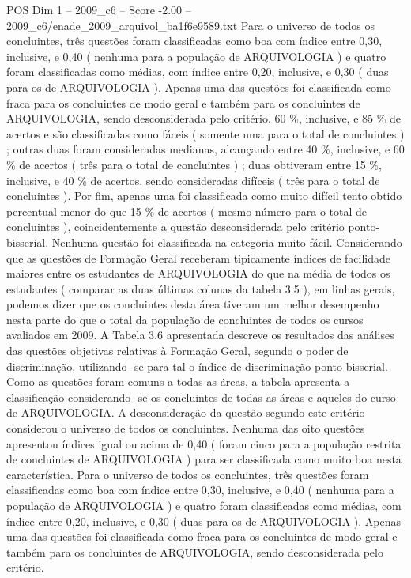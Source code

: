 \begin{textsample}{POS Dim 1 – 2009\_c6 – Score -2.00 – 2009\_c6/enade\_2009\_arquivol\_ba1f6e9589.txt}
Para o universo de todos os concluintes, três questões foram classificadas como boa com índice entre 0,30, inclusive, e 0,40 ( nenhuma para a população de ARQUIVOLOGIA ) e quatro foram classificadas como médias, com índice entre 0,20, inclusive, e 0,30 ( duas para os de ARQUIVOLOGIA ).
Apenas uma das questões foi classificada como fraca para os concluintes de modo geral e também para os concluintes de ARQUIVOLOGIA, sendo desconsiderada pelo critério. 60 \%, inclusive, e 85 \% de acertos e são classificadas como fáceis ( somente uma para o total de concluintes ) ; outras duas foram consideradas medianas, alcançando entre 40 \%, inclusive, e 60 \% de acertos ( três para o total de concluintes ) ; duas obtiveram entre 15 \%, inclusive, e 40 \% de acertos, sendo consideradas difíceis ( três para o total de concluintes ).
Por fim, apenas uma foi classificada como muito difícil tento obtido percentual menor do que 15 \% de acertos ( mesmo número para o total de concluintes ), coincidentemente a questão desconsiderada pelo critério ponto-bisserial.
Nenhuma questão foi classificada na categoria muito fácil.
Considerando que as questões de Formação Geral receberam tipicamente índices de facilidade maiores entre os estudantes de ARQUIVOLOGIA do que na média de todos os estudantes ( comparar as duas últimas colunas da tabela 3.5 ), em linhas gerais, podemos dizer que os concluintes desta área tiveram um melhor desempenho nesta parte do que o total da população de concluintes de todos os cursos avaliados em 2009.
A Tabela 3.6 apresentada descreve os resultados das análises das questões objetivas relativas à Formação Geral, segundo o poder de discriminação, utilizando -se para tal o índice de discriminação ponto-bisserial.
Como as questões foram comuns a todas as áreas, a tabela apresenta a classificação considerando -se os concluintes de todas as áreas e aqueles do curso de ARQUIVOLOGIA.
A desconsideração da questão segundo este critério considerou o universo de todos os concluintes.
Nenhuma das oito questões apresentou índices igual ou acima de 0,40 ( foram cinco para a população restrita de concluintes de ARQUIVOLOGIA ) para ser classificada como muito boa nesta característica.
Para o universo de todos os concluintes, três questões foram classificadas como boa com índice entre 0,30, inclusive, e 0,40 ( nenhuma para a população de ARQUIVOLOGIA ) e quatro foram classificadas como médias, com índice entre 0,20, inclusive, e 0,30 ( duas para os de ARQUIVOLOGIA ).
Apenas uma das questões foi classificada como fraca para os concluintes de modo geral e também para os concluintes de ARQUIVOLOGIA, sendo desconsiderada pelo critério.

\end{textsample}
